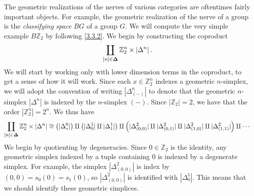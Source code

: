 \begin{example}\label{3.3.5}
    The geometric realizations of the nerves of various categories are oftentimes fairly important objects. For example, the geometric realization of the nerve of a group is the \emph{classifying space} $BG$ of a group $G$. We will compute the very simple example $B\mathbb{Z}_2$ by following \cref{3.3.2}. We begin by constructing the coproduct
    \[
    \coprod_{[n]\in\boldsymbol{\Delta}} \mathbb{Z}_2^n\times\left|\Delta^n\right|.
    \]
    We will start by working only with lower dimension terms in the coproduct, to get a sense of how it will work. Since each $x\in\mathbb{Z}_2^n$ indexes a geometric $n$-simplex, we will adopt the convention of writing $|\Delta^n_{(-)}|$ to denote that the geometric $n$-simplex $|\Delta^n|$ is indexed by the $n$-simplex $(-)$. Since $|\mathbb{Z}_2|=2$, we have that the order $\left|\mathbb{Z}_2^n\right|=2^n$. We thus have
    \[
    \coprod_{[n]\in\boldsymbol{\Delta}} \mathbb{Z}_2^n\times|\Delta^n|\cong \left(|\Delta^0_*|\right)\amalg\left(|\Delta^1_0|\amalg|\Delta^1_1|\right)\amalg\left(|\Delta^2_{(0,0)}|\amalg|\Delta^2_{(0,1)}|\amalg|\Delta^2_{(1,0)}|\amalg|\Delta^{2}_{(1,1)}|\right)\amalg\cdots
    \]
    We begin by quotienting by degeneracies. Since $0\in\mathbb{Z}_2$ is the identity, any geometric simplex indexed by a tuple containing 0 is indexed by a degenerate simplex. For example, the simplex $|\Delta^2_{(0,0)}|$ is index by $(0,0)=s_0(0)=s_1(0)$, so $|\Delta^2_{(0,0)}|$ is identified with $|\Delta^1_0|$. This means that we should identify these geometric simplices.


\end{example}
